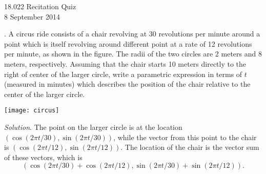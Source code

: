 \documentclass[11pt]{article}
\theoremstyle{definition}
\newcounter{prob}
\newcommand\itm{\theprob.  \stepcounter{prob}}
\newcommand\sol[2]{\textit{Solution}. #1}
\newcommand\sol[2]{#2}
\begin{document}
\thispagestyle{empty}

\begin{center}
  18.022 Recitation Quiz \iftoggle{solutions}{(with solutions)}{} \\
  8 September 2014 \\
\end{center}

\itm A circus ride consists of a chair revolving at 30 revolutions per
minute around a point which is itself revolving around different point at a
rate of 12 revolutions per minute, as shown in the figure. The radii of the
two circles are 2 meters and 8 meters, respectively. Assuming that the
chair starts 10 meters directly to the right of center of the larger
circle, write a parametric expression in terms of $t$ (measured in minutes)
which describes the position of the chair relative to the center of the
larger circle.

\begin{center} 
\texttt{[image: circus]}
\end{center} 

\sol{The point on the larger circle is at the location $(\cos(2\pi
  t/30),\sin (2\pi t/30))$, while the vector from this point to the chair
  is $(\cos(2\pi t/12),\sin (2\pi t/12))$. The location of the chair is the
  vector sum of these vectors, which is 
\[
(\cos(2\pi t/30) + \cos(2\pi t/12),\sin (2\pi t/30)+\sin (2\pi t/12)).
\]
}{}
\end{document}
